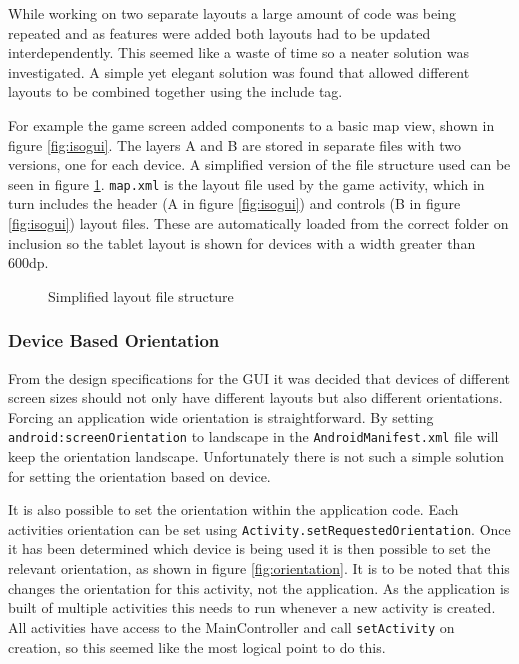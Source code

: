 While working on two separate layouts a large amount of code was being repeated and as features were added both layouts had to be updated interdependently. This seemed like a waste of time so a neater solution was investigated. A simple yet elegant solution was found that allowed different layouts to be combined together using the include tag.

For example the game screen added components to a basic map view, shown in figure \ref{fig:isogui}. The layers A and B are stored in separate files with two versions, one for each device. A simplified version of the file structure used can be seen in figure \ref{fig:fs}. \verb|map.xml| is the layout file used by the game activity, which in turn includes the header (A in figure \ref{fig:isogui}) and controls (B in figure \ref{fig:isogui}) layout files. These are automatically loaded from the correct folder on inclusion so the tablet layout is shown for devices with a width greater than 600dp.

\begin{figure}[H]
\caption{Simplified layout file structure}
\label{fig:fs}
\end{figure}

\subsubsection*{Device Based Orientation}
From the design specifications for the GUI it was decided that devices of different screen sizes should not only have different layouts but also different orientations. Forcing an application wide orientation is straightforward. By setting \verb|android:screenOrientation| to landscape in the \verb|AndroidManifest.xml| file will keep the orientation landscape. Unfortunately there is not such a simple solution for setting the orientation based on device.

It is also possible to set the orientation within the application code. Each activities orientation can be set using \verb|Activity.setRequestedOrientation|. Once it has been determined which device is being used it is then possible to set the relevant orientation, as shown in figure \ref{fig:orientation}. It is to be noted that this changes the orientation for this activity, not the application. As the application is built of multiple activities this needs to run whenever a new activity is created. All activities have access to the MainController and call \verb|setActivity| on creation, so this seemed like the most logical point to do this.

